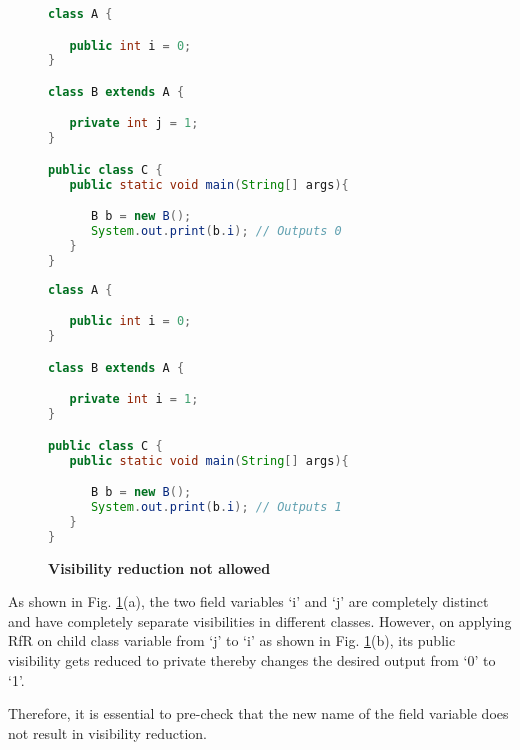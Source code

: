 \begin{figure}[th]
\centering
\begin{minipage}[t]{0.75\linewidth}
\begin{lstlisting}[language=java, basicstyle=\scriptsize\ttfamily,frame=single]
class A {

   public int i = 0;
}

class B extends A {

   private int j = 1;
}

public class C {
   public static void main(String[] args){

      B b = new B();
      System.out.print(b.i); // Outputs 0
   }
}
\end{lstlisting}
\end{minipage}
\hfill
\begin{minipage}[t]{0.75\linewidth}
\begin{lstlisting}[language=java, basicstyle=\scriptsize\ttfamily,frame=single]
class A {

   public int i = 0;
}

class B extends A {

   private int i = 1; 
}

public class C {
   public static void main(String[] args){

      B b = new B();
      System.out.print(b.i); // Outputs 1
   }
}
\end{lstlisting}
\end{minipage}
\caption{\textbf{Visibility reduction not allowed}}
\label{figure:jtoi}
\end{figure}


As shown in Fig. \ref{figure:jtoi}(a), the two field variables `i' and `j' are completely distinct and have completely separate visibilities in different classes. However, on applying RfR on child class variable from `j' to `i' as shown in Fig. \ref{figure:jtoi}(b), its public visibility gets reduced to private thereby changes the desired output from `0' to `1'. 

Therefore, it is essential to pre-check that the new name of the field variable does not result in visibility reduction. 
